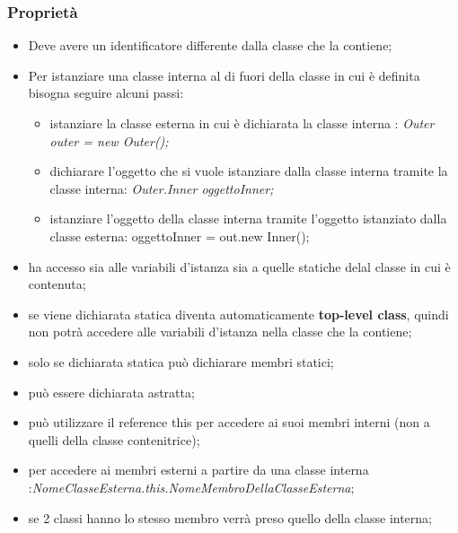\subsubsection{Proprietà}
\begin{itemize}
	\item Deve avere un identificatore differente dalla classe che la contiene;
	\item Per istanziare una classe interna al di fuori della classe in cui è definita bisogna seguire alcuni passi:
		\begin{itemize}
			\item istanziare la classe esterna in cui è dichiarata la classe interna : \textit{Outer outer = new Outer();}
			\item dichiarare l'oggetto che si vuole istanziare dalla classe interna tramite la classe interna: \textit{Outer.Inner oggettoInner;}
			\item istanziare l'oggetto della classe interna tramite l'oggetto istanziato dalla classe esterna: oggettoInner = out.new Inner();
		\end{itemize}
		\item ha accesso sia alle variabili d'istanza sia a quelle statiche delal classe in cui è contenuta;
		\item se viene dichiarata statica diventa automaticamente \textbf{top-level class}, quindi non potrà accedere alle variabili d'istanza nella classe che la contiene;
		\item solo se dichiarata statica può dichiarare membri statici;
		\item può essere dichiarata astratta;
		\item può utilizzare il reference this per accedere ai suoi membri interni (non a quelli della classe contenitrice);
		\item per accedere ai membri esterni a partire da una classe interna :\textit{NomeClasseEsterna.this.NomeMembroDellaClasseEsterna};
		\item se 2 classi hanno lo stesso membro verrà preso quello della classe interna;
	\end{itemize}

